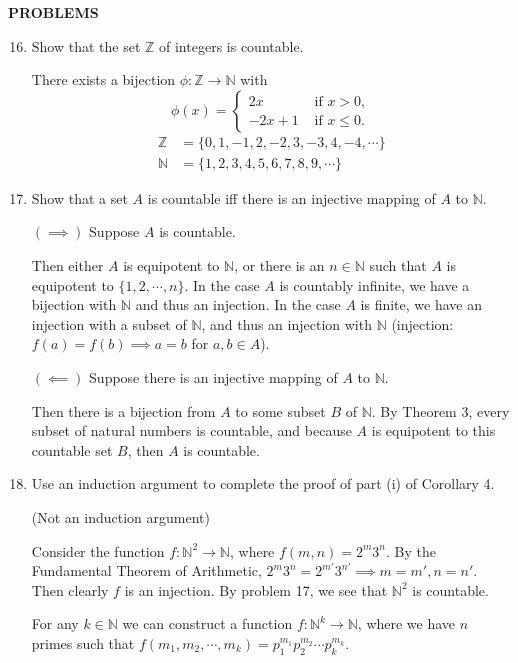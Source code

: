 \documentclass[a4paper,10pt]{book}
\theoremstyle{plain} %
\begin{document}
\begin{center}
	\textbf{PROBLEMS}
\end{center}
\begin{enumerate}
	\setcounter{enumi}{15}
	\item Show that the set $\mathbb{Z}$ of integers is countable.\par
	There exists a bijection $\phi: \mathbb{Z} \to \mathbb{N}$ with
	\[ 
		\phi(x) =
		\begin{cases} 
			2x & \text{ if } x > 0, \\
			-2x+1 & \text{ if } x \le 0.
		\end{cases}
	\]
	\begin{align*}
		\mathbb{Z} &= \{0,1,-1,2,-2,3,-3,4,-4, \cdots\} \\
		\mathbb{N} &= \{1,2,3,4,5,6,7,8,9, \cdots\}
	\end{align*}
	\item Show that a set $A$ is countable iff there is an injective mapping of $A$ to $\mathbb{N}$.\par
	$(\implies)$ Suppose $A$ is countable.\par
	Then either $A$ is equipotent to $\mathbb{N}$, or there is an $n \in \mathbb{N}$ such that $A$ is equipotent to $\{1,2, \cdots, n \}$.
	In the case $A$ is countably infinite, we have a bijection with $\mathbb{N}$ and thus an injection. In the case $A$ is finite, we have an injection with a subset of $\mathbb{N}$, and thus an injection with $\mathbb{N}$
	(injection: $f(a)=f(b) \implies a=b$ for $a,b \in A$).
	\par
	$(\impliedby)$ Suppose there is an injective mapping of $A$ to $\mathbb{N}$.\par
	Then there is a bijection from $A$ to some subset $B$ of $\mathbb{N}$.
	By Theorem 3, every subset of natural numbers is countable, and because $A$ is equipotent to this countable set $B$, then $A$ is countable.
	\item Use an induction argument to complete the proof of part (i) of Corollary 4.\par
	(Not an induction argument)\par
	Consider the function $f:\mathbb{N}^2 \to \mathbb{N}$, where $f(m,n) = 2^m3^n$. 
	By the Fundamental Theorem of Arithmetic, $2^m3^n = 2^{m'}3^{n'} \implies m=m',n=n'$.
	Then clearly $f$ is an injection. By problem 17, we see that $\mathbb{N}^2$ is countable.
	\par
	For any $k\in \mathbb{N}$ we can construct a function $f:\mathbb{N}^k \to \mathbb{N}$, where we have $n$ primes such that $f(m_1,m_2, \cdots, m_k) = p_1^{m_1}p_2^{m_2} \cdots p_k^{m_k}$.

\end{enumerate}
\end{document}

